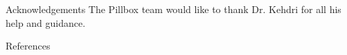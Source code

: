 \documentclass[22pt]{beamer}
\begin{document}
\begin{frame}[fragile]
\begin{textblock}{7.25}
\begin{block}{Acknowledgements}
The Pillbox team would like to thank Dr. Kehdri for all his help and guidance.
\end{block}


\begin{block}{References}

{\scriptsize
}
\end{block}


\end{textblock}


\end{frame}
\end{document}

